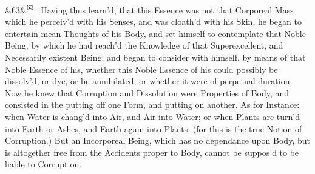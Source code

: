 \documentclass[12pt]{article}
\newcommand{\para}[1][]{\par\noindent\ifx&#1&\else\textsuperscript{\footnotesize #1}~\fi}
\begin{document}
\para[63] Having thus learn'd, that this Essence was not that Corporeal Mass which he perceiv'd with his Senses, and was cloath'd with his Skin, he began to entertain mean Thoughts of his Body, and set himself to contemplate that Noble Being, by which he had reach'd the Knowledge of that Superexcellent, and Necessarily existent Being; and began to consider with himself, by means of that Noble Essence of his, whether this Noble Essence of his could possibly be dissolv'd, or dye, or be annihilated; or whether it were of perpetual duration. Now he knew that Corruption and Dissolution were Properties of Body, and consisted in the putting off one Form, and putting on another. As for Instance: when Water is chang'd into Air, and Air into Water; or when Plants are turn'd into Earth or Ashes, and Earth again into Plants; (for this is the true Notion of Corruption.) But an Incorporeal Being, which has no dependance upon Body, but is altogether free from the Accidents proper to Body, cannot be suppos'd to be liable to Corruption.
\end{document}

